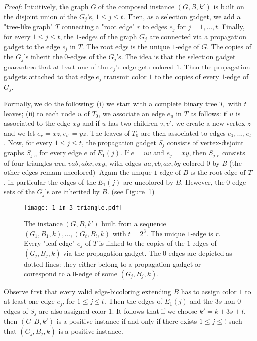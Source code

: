 \documentclass[11pt]{article}
\newenvironment{proof}{\noindent\textit{Proof: }}{{\hfill $\Box$}}
\begin{document}
\begin{proof}
Intuitively, the graph $G$ of the composed instance $(G,B,k')$ is built on the disjoint union of the $G_j$'s, $1\leqslant j\leqslant t$.  Then, as a selection gadget, we add a "tree-like graph" $T$ connecting a "root edge" $r$ to edges $e_j$ for $j = 1,...,t$. Finally, for every $1\leqslant j\leqslant t$, the $1$-edges of the graph $G_j$ are connected via a propagation gadget to the edge $e_j$ in $T$. The root edge is the unique $1$-edge of $G$. The copies of the $G_j$'s inherit the $0$-edges of the $G_j$'s. The idea is that the selection gadget guarantees that at least one of the $e_j$'s edge gets colored $1$. Then the propagation gadgets attached to that edge $e_j$ transmit color $1$ to the copies of every $1$-edge of $G_j$.

Formally, we do the following: (i) we start with a complete binary tree $T_0$ with $t$ leaves; (ii) to each node $u$ of $T_0$, we associate an edge $e_u$ in $T$ as follows: if $u$ is associated to the edge $xy$ and if $u$ has two children $v,v'$, we create a new vertex $z$ and we let $e_v = xz, e_{v'} = yz$. The leaves of $T_0$ are then associated to edges $e_1,...,e_t$. Now, for every $1\leqslant j\leqslant t$, the propagation gadget $S_j$ consists of vertex-disjoint graphs $S_{j,e}$ for every edge $e$ of $E_1(j)$. If $e = uv$ and $e_j = xy$, then $S_{j,e}$ consists of four triangles $uva, vab, abx, bxy$, with edges $ua,vb,ax,by$ colored $0$ by $B$ (the other edges remain uncolored). Again the unique $1$-edge of $B$ is the root edge of $T$, in particular the edges of the $E_1(j)$ are uncolored by $B$. However, the $0$-edge sets of the $G_j$'s are inherited by $B$. (see Figure~\ref{fig:not-1-in-3-triangle})


\begin{figure}[ht]
\centerline{\texttt{[image: 1-in-3-triangle.pdf]}}
\caption{The instance $(G,B,k')$ built from a sequence $(G_1,B_1,k),\dots,(G_t,B_t,k)$ with $t=2^3$. The unique $1$-edge is $r$. Every "leaf edge" $e_j$ of $T$ is linked to the copies of the $1$-edges of $(G_j,B_j,k)$ via the propagation gadget. The $0$-edges are depicted as dotted lines: they either belong to a propagation gadget or correspond to a $0$-edge of some $(G_j,B_j,k)$.
\label{fig:not-1-in-3-triangle}}
\end{figure}


Observe first that every valid edge-bicoloring extending $B$ has to assign color $1$ to at least one edge $e_j$, for $1\leqslant j\leqslant t$. Then the edges of $E_1(j)$ and the $3s$ non $0$-edges of $S_j$ are also assigned color $1$. It follows that if we choose $k'=k+3s+l$, then $(G,B,k')$ is a positive instance if and only if there exists $1\leqslant j\leqslant t$ such that $(G_j,B_j,k)$ is a positive instance.
 \end{proof}\\
\end{document}
